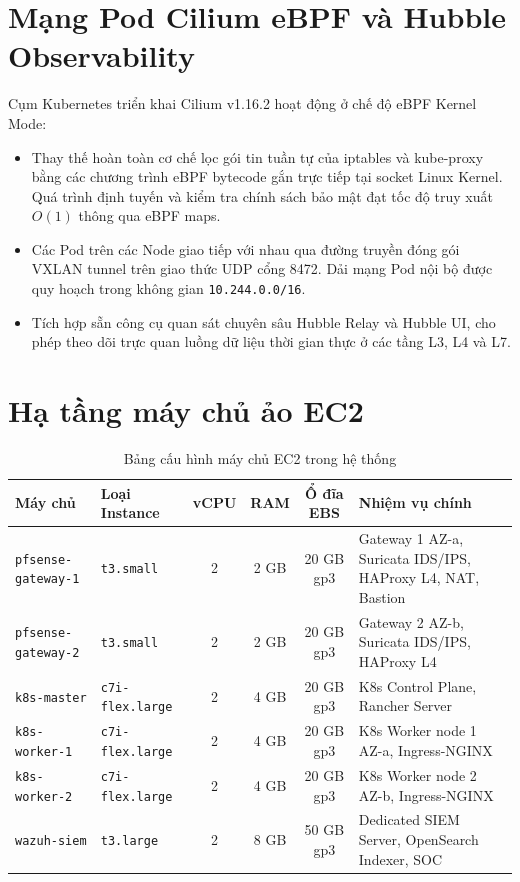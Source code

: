 \section{Mạng Pod Cilium eBPF và Hubble Observability}
Cụm Kubernetes triển khai Cilium v1.16.2 hoạt động ở chế độ eBPF Kernel Mode:
\begin{itemize}
    \item Thay thế hoàn toàn cơ chế lọc gói tin tuần tự của iptables và kube-proxy bằng các chương trình eBPF bytecode gắn trực tiếp tại socket Linux Kernel. Quá trình định tuyến và kiểm tra chính sách bảo mật đạt tốc độ truy xuất $O(1)$ thông qua eBPF maps.
    \item Các Pod trên các Node giao tiếp với nhau qua đường truyền đóng gói VXLAN tunnel trên giao thức UDP cổng 8472. Dải mạng Pod nội bộ được quy hoạch trong không gian \texttt{10.244.0.0/16}.
    \item Tích hợp sẵn công cụ quan sát chuyên sâu Hubble Relay và Hubble UI, cho phép theo dõi trực quan luồng dữ liệu thời gian thực ở các tầng L3, L4 và L7.
\end{itemize}

\section{Hạ tầng máy chủ ảo EC2}

\begin{table}[H]
    \centering
    \small
    \renewcommand{\arraystretch}{1.25}
    \caption{Bảng cấu hình máy chủ EC2 trong hệ thống}
    \label{tab:ec2_resources}
    \begin{tabularx}{\textwidth}{l l c c c X}
        \toprule
        \textbf{Máy chủ} & \textbf{Loại Instance} & \textbf{vCPU} & \textbf{RAM} & \textbf{Ổ đĩa EBS} & \textbf{Nhiệm vụ chính} \\
        \midrule
        \texttt{pfsense-gateway-1} & \texttt{t3.small} & 2 & 2 GB & 20 GB gp3 & Gateway 1 AZ-a, Suricata IDS/IPS, HAProxy L4, NAT, Bastion \\
        \texttt{pfsense-gateway-2} & \texttt{t3.small} & 2 & 2 GB & 20 GB gp3 & Gateway 2 AZ-b, Suricata IDS/IPS, HAProxy L4 \\
        \texttt{k8s-master} & \texttt{c7i-flex.large} & 2 & 4 GB & 20 GB gp3 & K8s Control Plane, Rancher Server \\
        \texttt{k8s-worker-1} & \texttt{c7i-flex.large} & 2 & 4 GB & 20 GB gp3 & K8s Worker node 1 AZ-a, Ingress-NGINX \\
        \texttt{k8s-worker-2} & \texttt{c7i-flex.large} & 2 & 4 GB & 20 GB gp3 & K8s Worker node 2 AZ-b, Ingress-NGINX \\
        \texttt{wazuh-siem} & \texttt{t3.large} & 2 & 8 GB & 50 GB gp3 & Dedicated SIEM Server, OpenSearch Indexer, SOC \\
        \bottomrule
    \end{tabularx}
\end{table}
